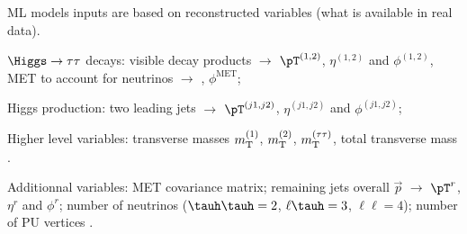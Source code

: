 \begin{frame}%

\manip ML models inputs are based on reconstructed variables (what is available in real data).

\pause
\manip $\Higgs\to\tau\tau$ decays:
\submanip visible decay products $\to$ $\pT^{(1,2)}$, $\eta^{(1,2)}$ and $\phi^{(1,2)}$,
\submanip MET to account for neutrinos $\to$ \MET, $\phi^\text{MET}$;

\pause
\manip Higgs production:
\submanip two leading jets $\to$ $\pT^{(j1,j2)}$, $\eta^{(j1,j2)}$ and $\phi^{(j1,j2)}$;

\pause
\manip Higher level variables:
\submanip transverse masses $m_{\mathrm{T}}^{(1)}$, $m_{\mathrm{T}}^{(2)}$, $m_{\mathrm{T}}^{(\tau\tau)}$,
\submanip total transverse mass \mTtot.

\pause
\manip Additionnal variables:
\submanip MET covariance matrix;
\submanip remaining jets overall $\vec{p}$ $\to$ $\pT^r$, $\eta^r$ and $\phi^r$;
\submanip number of neutrinos ($\tauh\tauh = 2$, $\ell\tauh=3$, $\ell\ell=4$);
\submanip number of PU vertices .

%

\end{frame}
